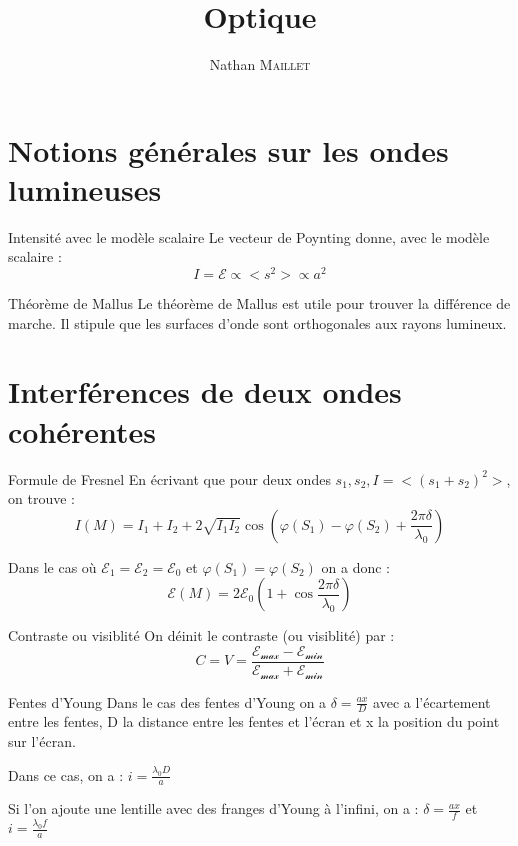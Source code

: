 \documentclass[french, a4paper, 11pt, twocolumn]{article}
\title{Optique}
\author{Nathan \textsc{Maillet}}
\date{}
\newcommand{\po}{\left(}         %
\newcommand{\pf}{\right)}        %
\newcommand{\pof}[1]{\po #1 \pf} %
\begin{document}
\maketitle

\section{Notions générales sur les ondes lumineuses}
\begin{cadre}{Intensité avec le modèle scalaire}
    Le vecteur de Poynting donne, avec le modèle scalaire :
        \[I=\mathcal{E}\propto <s^2> \propto a^2\]
\end{cadre}

\begin{cadre}{Théorème de Mallus}
    Le théorème de Mallus est utile pour trouver la différence de marche.
    Il stipule que les surfaces d'onde sont orthogonales aux rayons lumineux.    
\end{cadre}

\section{Interférences de deux ondes cohérentes}
\begin{cadre}{Formule de Fresnel}
    En écrivant que pour deux ondes \(s_1,s_2, I=<(s_1+s_2)^2>\), on trouve :
        \[I(M)=I_1+I_2+2\sqrt{I_1I_2}\cos\left(\varphi(S_1)-\varphi(S_2)+\frac{2\pi \delta}{\lambda_0}\right)\]
    
    \tcblower
    Dans le cas où \(\mathcal{E}_1=\mathcal{E}_2=\mathcal{E}_0\) et \(\varphi(S_1)=\varphi(S_2)\) on a donc :
        \[\mathcal{E}(M)=2\mathcal{E}_0\pof{1+\cos{\frac{2\pi \delta}{\lambda_0}}}\]
\end{cadre}

\begin{cadre}{Contraste ou visiblité}
    On déinit le contraste (ou visiblité) par :
        \[C=V=\dfrac{\mathcal{E_{\text{max}}-E_{\text{min}}}}{\mathcal{E_{\text{max}}+E_{\text{min}}}}\]    
\end{cadre}

\begin{cadre}{Fentes d'Young}
    Dans le cas des fentes d'Young on a \(\delta=\frac{ax}{D}\) avec a l'écartement entre les fentes, D la distance entre
    les fentes et l'écran et x la position du point sur l'écran.

    Dans ce cas, on a : \(i=\frac{\lambda_0D}{a}\)

    Si l'on ajoute une lentille avec des franges d'Young à l'infini, on a : \(\delta=\frac{ax}{f}\) et \(i=\frac{\lambda_0f}{a}\)
\end{cadre}
\end{document}
